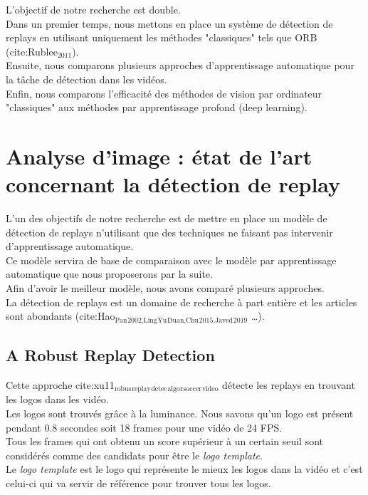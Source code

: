 \documentclass[11pt]{article}
\begin{document}
L'objectif de notre recherche est double.\\
Dans un premier temps, nous mettons en place un système de détection de replays en utilisant uniquement les méthodes "classiques" tels que ORB (cite:Rublee\(_{\text{2011}}\)).\\
Ensuite, nous comparons plusieurs approches d'apprentissage automatique pour la tâche de détection dans les vidéos.\\
Enfin, nous comparons l'efficacité des méthodes de vision par ordinateur "classiques" aux méthodes par apprentissage profond (deep learning).\\

\newpage
\section{Analyse d'image : état de l'art concernant la détection de replay}
\label{sec:orgaab8344}
L'un des objectifs de notre recherche est de mettre en place un modèle de détection de replays n'utilisant que des techniques ne faisant pas intervenir d'apprentissage automatique.\\
Ce modèle servira de base de comparaison avec le modèle par apprentissage automatique que nous proposerons par la suite.\\
Afin d'avoir le meilleur modèle, nous avons comparé plusieurs approches.\\

La détection de replays est un domaine de recherche à part entière et les articles sont abondants (cite:Hao\(_{\text{Pan}}\)\(_{\text{2002,Ling}}\)\(_{\text{Yu}}\)\(_{\text{Duan,Chu}}\)\(_{\text{2015,Javed}}\)\(_{\text{2019}}\) \ldots{}).\\

\subsection{A Robust Replay Detection}
\label{sec:org5f94d65}
Cette approche cite:xu11\(_{\text{robus}}\)\(_{\text{replay}}\)\(_{\text{detec}}\)\(_{\text{algor}}\)\(_{\text{soccer}}\)\(_{\text{video}}\) détecte les replays en trouvant les logos dans les vidéo.\\
Les logos sont trouvés grâce à la luminance. Nous savons qu'un logo est présent pendant 0.8 secondes soit 18 frames pour une vidéo de 24 FPS.\\
Tous les frames qui ont obtenu un score supérieur à un certain seuil sont considérés comme des candidats pour être le \emph{logo template}.\\
Le \emph{logo template} est le logo qui représente le mieux les logos dans la vidéo et c'est celui-ci qui va servir de référence pour trouver tous les logos.\\
\end{document}
